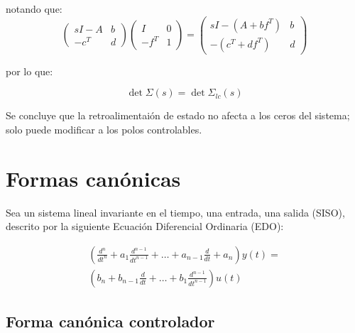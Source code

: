 \begin{enumerate}
            notando que:
            \begin{equation*}
                \begin{pmatrix}
                    sI - A & b \\
                    -c^T & d
                \end{pmatrix}
                \begin{pmatrix}
                    I & 0 \\
                    -f^T & 1
                \end{pmatrix} =
                \begin{pmatrix}
                    sI - (A + b f^T) & b \\
                    -(c^T + d f^T) & d
                \end{pmatrix}
            \end{equation*}

            por lo que:

            \begin{equation}
                \det{\Sigma(s)} = \det{\Sigma_{lc}(s)}
            \end{equation}

            Se concluye que la retroalimentaión de estado no afecta a los ceros del sistema; solo puede modificar a los polos controlables.
        \end{enumerate}

    \newpage
    \section{Formas canónicas}
        Sea un sistema lineal invariante en el tiempo, una entrada, una salida (SISO), descrito por la siguiente Ecuación Diferencial Ordinaria (EDO):

        \begin{multline}
            \left( \frac{d^n}{dt^n} + a_1 \frac{d^{n-1}}{dt^{n-1}} + \dots + a_{n-1} \frac{d}{dt} + a_n \right) y(t) = \\
            \left( b_n + b_{n-1} \frac{d}{dt} + \dots + b_1 \frac{d^{n-1}}{dt^{n-1}} \right) u(t)
        \end{multline}

        \subsection{Forma canónica controlador}

